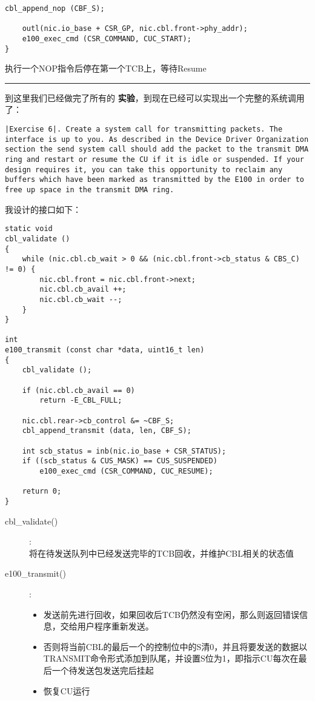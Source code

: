 \documentclass{article}
\newcommand{\highlight}[1]{{\bfseries \color{red}  #1}}
\begin{document}
\begin{CJK*}{UTF8}{gkai}
\begin{lstlisting}[style=ccode, title={\scriptsize \ttfamily \bfseries kern/e100.c: cbl\_init()}]
    cbl_append_nop (CBF_S);

    outl(nic.io_base + CSR_GP, nic.cbl.front->phy_addr);
    e100_exec_cmd (CSR_COMMAND, CUC_START); 
}
\end{lstlisting}

执行一个NOP指令后停在第一个TCB上，等待Resume


\vspace{2em}
\hrule
\vspace{2em}

到这里我们已经做完了所有的\highlight{实验}，到现在已经可以实现出一个完整的系统调用了：


\begin{lstlisting}[style=exercise]
|Exercise 6|. Create a system call for transmitting packets. The interface is up to you. As described in the Device Driver Organization section the send system call should add the packet to the transmit DMA ring and restart or resume the CU if it is idle or suspended. If your design requires it, you can take this opportunity to reclaim any buffers which have been marked as transmitted by the E100 in order to free up space in the transmit DMA ring.
\end{lstlisting}

我设计的接口如下：

\begin{lstlisting}[style=ccode, title={\scriptsize \ttfamily \bfseries kern/e100.c}]
static void
cbl_validate () 
{
    while (nic.cbl.cb_wait > 0 && (nic.cbl.front->cb_status & CBS_C) != 0) {
        nic.cbl.front = nic.cbl.front->next;
        nic.cbl.cb_avail ++;
        nic.cbl.cb_wait --;
    }
}

int 
e100_transmit (const char *data, uint16_t len)
{
    cbl_validate ();

    if (nic.cbl.cb_avail == 0)
        return -E_CBL_FULL;
    
    nic.cbl.rear->cb_control &= ~CBF_S;
    cbl_append_transmit (data, len, CBF_S);

    int scb_status = inb(nic.io_base + CSR_STATUS);
    if ((scb_status & CUS_MASK) == CUS_SUSPENDED)
        e100_exec_cmd (CSR_COMMAND, CUC_RESUME); 

    return 0;
}
\end{lstlisting}

\label{cususpend}

\begin{description}
\item[cbl\_validate()]:\\
将在待发送队列中已经发送完毕的TCB回收，并维护CBL相关的状态值
\item[e100\_transmit()]:
\begin{itemize}
\item{发送前先进行回收，如果回收后TCB仍然没有空闲，那么则返回错误信息，交给用户程序重新发送。}
\item{否则将当前CBL的最后一个的控制位中的S清0，并且将要发送的数据以TRANSMIT命令形式添加到队尾，并设置S位为1，即指示CU每次在最后一个待发送包发送完后挂起}
\item{恢复CU运行}


\end{itemize}
\end{description}
\end{CJK*}
\end{document}
